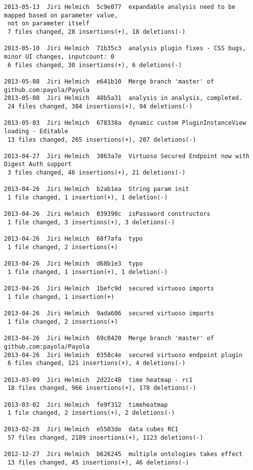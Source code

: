 {\begin{verbatim}
2013-05-13  Jiri Helmich  5c9e077  expandable analysis need to be mapped based on parameter value,
 not on parameter itself
 7 files changed, 28 insertions(+), 18 deletions(-)

2013-05-10  Jiri Helmich  71b35c3  analysis plugin fixes - CSS bugs, minor UI changes, inputcount: 0
 6 files changed, 30 insertions(+), 6 deletions(-)

2013-05-08  Jiri Helmich  e641b10  Merge branch 'master' of github.com:payola/Payola
2013-05-08  Jiri Helmich  48b5a31  analysis in analysis, completed.
 24 files changed, 384 insertions(+), 94 deletions(-)

2013-05-03  Jiri Helmich  678338a  dynamic custom PluginInstanceView loading - Editable
 13 files changed, 265 insertions(+), 207 deletions(-)

2013-04-27  Jiri Helmich  3863a7e  Virtuoso Secured Endpoint now with Digest Auth support
 3 files changed, 46 insertions(+), 21 deletions(-)

2013-04-26  Jiri Helmich  b2ab1ea  String param init
 1 file changed, 1 insertion(+), 1 deletion(-)

2013-04-26  Jiri Helmich  039390c  isPassword constructors
 1 file changed, 3 insertions(+), 3 deletions(-)

2013-04-26  Jiri Helmich  68f7afa  typo
 1 file changed, 2 insertions(+)

2013-04-26  Jiri Helmich  d68b1e3  typo
 1 file changed, 1 insertion(+), 1 deletion(-)

2013-04-26  Jiri Helmich  1befc9d  secured virtuoso imports
 1 file changed, 1 insertion(+)

2013-04-26  Jiri Helmich  9ada606  secured virtuoso imports
 1 file changed, 2 insertions(+)

2013-04-26  Jiri Helmich  69c0420  Merge branch 'master' of github.com:payola/Payola
2013-04-26  Jiri Helmich  0358c4e  secured virtuoso endpoint plugin
 6 files changed, 121 insertions(+), 4 deletions(-)

2013-03-09  Jiri Helmich  2d22c48  time heatmap - rc1
 18 files changed, 966 insertions(+), 178 deletions(-)

2013-03-02  Jiri Helmich  fe9f312  timeheatmap
 1 file changed, 2 insertions(+), 2 deletions(-)

2013-02-28  Jiri Helmich  e5503de  data cubes RC1
 57 files changed, 2189 insertions(+), 1123 deletions(-)

2012-12-27  Jiri Helmich  b626245  multiple ontologies takes effect
 13 files changed, 45 insertions(+), 46 deletions(-)


\end{verbatim}}
